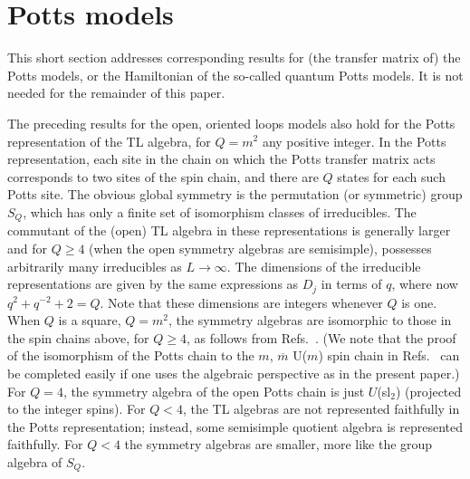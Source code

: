 \documentclass[twocolumn,floats,pra]{revtex4}
\begin{document}

\section{Potts models}
\label{potts}

This short section addresses corresponding results for (the
transfer matrix of) the Potts models, or the Hamiltonian of the
so-called quantum Potts models. It is not needed for the remainder
of this paper.

The preceding results for the open, oriented loops models also
hold for the Potts representation of the TL algebra, for $Q=m^2$
any positive integer. In the Potts representation, each site in
the chain on which the Potts transfer matrix acts corresponds to
two sites of the spin chain, and there are $Q$ states for each
such Potts site. The obvious global symmetry is the permutation
(or symmetric) group $S_Q$, which has only a finite set of
isomorphism classes of irreducibles. The commutant of the (open)
TL algebra in these representations is generally larger and for
$Q\geq 4$ (when the open symmetry algebras are semisimple),
possesses arbitrarily many irreducibles as $L\to\infty$. The
dimensions of the irreducible representations are given by the
same expressions as $D_j$ in terms of $q$, where now
$q^2+q^{-2}+2=Q$. Note that these dimensions are integers whenever
$Q$ is one. When $Q$ is a square, $Q=m^2$, the symmetry algebras
are isomorphic to those in the spin chains above, for $Q\geq4$, as
follows from Refs.\ \cite{bb,affleck3}. (We note that the proof of
the isomorphism of the Potts chain to the $m$, $\overline{m}$
U($m$) spin chain in Refs.\ \cite{bb,affleck3} can be completed
easily if one uses the algebraic perspective as in the present
paper.) For $Q=4$, the symmetry algebra of the open Potts chain is
just $U$(sl$_2$) (projected to the integer spins). For $Q<4$, the
TL algebras are not represented faithfully in the Potts
representation; instead, some semisimple quotient algebra
\cite{jones1} is represented faithfully. For $Q<4$ the symmetry
algebras are smaller, more like the group algebra of $S_Q$.
\end{document}
